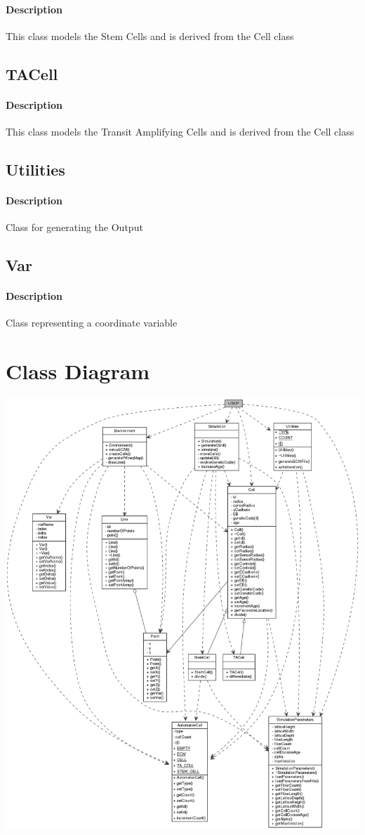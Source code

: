 \documentclass[11pt]{report}
\begin{document}
  \paragraph{Description}
  This class models the Stem Cells and is derived from the Cell class
  \subsection{\color{blue}TACell}
  \paragraph{Description}
  This class models the Transit Amplifying Cells and is derived from the Cell class
  \subsection{\color{blue}Utilities}
  \paragraph{Description}
  Class for generating the Output
  \subsection{\color{blue}Var}
  \paragraph{Description}
  Class representing a coordinate variable
  \pagebreak
  \section{\color{red}Class Diagram}
    \includegraphics[width=7in]{../diag/classDiagram/class_diag.png}
  
\end{document}
